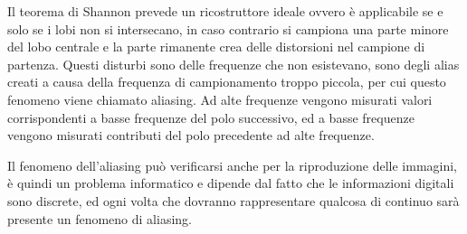 \documentclass{article}
\numberwithin{equation}{subsection}
\begin{document}
Il teorema di Shannon prevede un ricostruttore ideale ovvero è applicabile se e solo se i lobi non si intersecano, in caso contrario si campiona una parte minore del 
lobo centrale e la parte rimanente crea delle distorsioni nel campione di partenza. Questi disturbi sono delle frequenze che non esistevano, sono degli alias creati a causa 
della frequenza di campionamento troppo piccola, per cui questo fenomeno viene chiamato aliasing. Ad alte frequenze vengono misurati valori corrispondenti a basse 
frequenze del polo successivo, ed a basse frequenze vengono misurati contributi del polo precedente ad alte frequenze. 

\begin{center}
\end{center}

Il fenomeno dell'aliasing può verificarsi anche per la riproduzione delle immagini, è quindi un problema informatico e dipende dal fatto che le informazioni digitali sono 
discrete, ed ogni volta che dovranno rappresentare qualcosa di continuo sarà presente un fenomeno di aliasing. 
\end{document}
